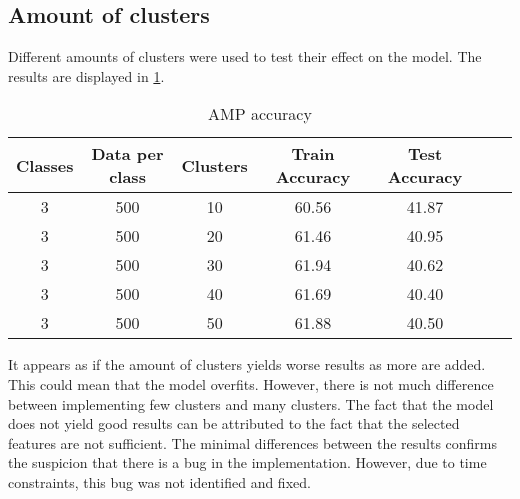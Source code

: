 \subsection*{Amount of clusters}
Different amounts of clusters were used to test their effect on the model. The results are displayed in \ref{table:HMMclusters}.
\begin{table}[h!]
\begin{center}
\begin{tabular}{| c | c | c | c | c | c | c |}
\hline
 {\textbf{Classes}} 	 
 & {\textbf{Data per class}} 					& {\textbf{Clusters}} 
 & {\textbf{Train Accuracy}} 					& {\textbf{Test Accuracy}} 
 \\
\hline
3 	 		& 500 		& 10			& 60.56		& 41.87		\\
3 	 		& 500 		& 20			& 61.46		& 40.95		\\
3 	 		& 500 		& 30			& 61.94		& 40.62		\\
3 	 		& 500 		& 40			& 61.69		& 40.40		\\
3 	 		& 500 		& 50			& 61.88		& 40.50		\\
\hline
\end{tabular}
\caption{AMP accuracy}
\label{table:HMMclusters}
\end{center}
\end{table}

It appears as if the amount of clusters yields worse results as more are added. This could mean that the model overfits. However, there is not much difference between implementing few clusters and many clusters. The fact that the model does not yield good results can be attributed to the fact that the selected features are not sufficient. The minimal differences between the results confirms the suspicion that there is a bug in the implementation. However, due to time constraints, this bug was not identified and fixed.